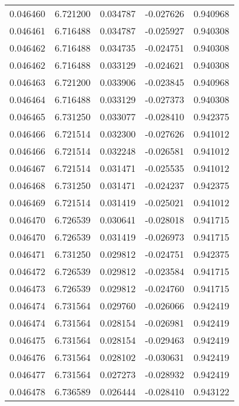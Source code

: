 \begin{tabular}{lrrrr}
0.046460    &  6.721200 &  0.034787 & -0.027626 &             0.940968 \\
0.046461    &  6.716488 &  0.034787 & -0.025927 &             0.940308 \\
0.046462    &  6.716488 &  0.034735 & -0.024751 &             0.940308 \\
0.046462    &  6.716488 &  0.033129 & -0.024621 &             0.940308 \\
0.046463    &  6.721200 &  0.033906 & -0.023845 &             0.940968 \\
0.046464    &  6.716488 &  0.033129 & -0.027373 &             0.940308 \\
0.046465    &  6.731250 &  0.033077 & -0.028410 &             0.942375 \\
0.046466    &  6.721514 &  0.032300 & -0.027626 &             0.941012 \\
0.046466    &  6.721514 &  0.032248 & -0.026581 &             0.941012 \\
0.046467    &  6.721514 &  0.031471 & -0.025535 &             0.941012 \\
0.046468    &  6.731250 &  0.031471 & -0.024237 &             0.942375 \\
0.046469    &  6.721514 &  0.031419 & -0.025021 &             0.941012 \\
0.046470    &  6.726539 &  0.030641 & -0.028018 &             0.941715 \\
0.046470    &  6.726539 &  0.031419 & -0.026973 &             0.941715 \\
0.046471    &  6.731250 &  0.029812 & -0.024751 &             0.942375 \\
0.046472    &  6.726539 &  0.029812 & -0.023584 &             0.941715 \\
0.046473    &  6.726539 &  0.029812 & -0.024760 &             0.941715 \\
0.046474    &  6.731564 &  0.029760 & -0.026066 &             0.942419 \\
0.046474    &  6.731564 &  0.028154 & -0.026981 &             0.942419 \\
0.046475    &  6.731564 &  0.028154 & -0.029463 &             0.942419 \\
0.046476    &  6.731564 &  0.028102 & -0.030631 &             0.942419 \\
0.046477    &  6.731564 &  0.027273 & -0.028932 &             0.942419 \\
0.046478    &  6.736589 &  0.026444 & -0.028410 &             0.943122 \\

\end{tabular}
